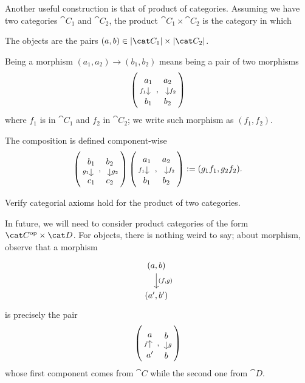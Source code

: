 Another useful construction is that of product of categories. Assuming we have two categories \(\cat C_1\) and \(\cat C_2\), the product \(\cat C_1 \times \cat C_2\) is the category in which
\begin{tcbitem}
\item The objects are the pairs \((a, b) \in \obj{\cat C_1} \times \obj{\cat C_2}\).
\item Being a morphism \((a_1, a_2) \to (b_1, b_2)\) means being a pair of two morphisms
\[\left(\begin{tikzcd}[row sep=small] a_1 \ar["{f_1}", d, swap] \\ b_1 \end{tikzcd}, \begin{tikzcd}[row sep=small] a_2 \ar["{f_2}", d] \\ b_2 \end{tikzcd}\right)\]
where \(f_1\) is in \(\cat C_1\) and \(f_2\) in \(\cat C_2\); we write such morphism as \(\left(f_1, f_2\right)\).
\item The composition is defined component-wise
\[\left(\begin{tikzcd}[row sep=small] b_1 \ar["{g_1}", d, swap] \\ c_1 \end{tikzcd}, \begin{tikzcd}[row sep=small] b_2 \ar["{g_2}", d] \\ c_2 \end{tikzcd}\right) \left(\begin{tikzcd}[row sep=small] a_1 \ar["{f_1}", d, swap] \\ b_1 \end{tikzcd}, \begin{tikzcd}[row sep=small] a_2 \ar["{f_2}", d] \\ b_2 \end{tikzcd}\right) := (g_1 f_1, g_2 f_2) .\]
\end{tcbitem}

\begin{exercise}
Verify categorial axioms hold for the product of two categories.
\end{exercise}

In future, we will need to consider product categories of the form \(\opcat C \times \cat D\). For objects, there is nothing weird to say; about morphism, observe that a morphism
\[\begin{tikzcd} (a, b) \ar["{(f, g)}", d] \\ (a', b')\end{tikzcd}\]
is precisely the pair
\[\left(\begin{tikzcd}[row sep=small] a \\ a' \ar["f", u] \end{tikzcd}, \begin{tikzcd}[row sep=small] b \ar["g", d] \\ b \end{tikzcd}\right)\]
whose first component comes from \(\cat C\) while the second one from \(\cat D\).

